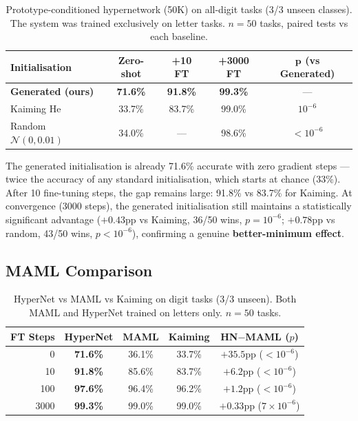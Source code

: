 \documentclass[11pt,a4paper]{article}
\begin{document}
\begin{table}[H]
\centering
\caption{Prototype-conditioned hypernetwork (50K) on all-digit tasks (3/3 unseen classes). The system was trained exclusively on letter tasks. $n = 50$ tasks, paired tests vs each baseline.}
\label{tab:core}
\begin{tabular}{lcccc}
\toprule
\textbf{Initialisation} & \textbf{Zero-shot} & \textbf{+10 FT} & \textbf{+3000 FT} & $\boldsymbol{p}$ \textbf{(vs Generated)} \\
\midrule
\textbf{Generated (ours)} & \textbf{71.6\%} & \textbf{91.8\%} & \textbf{99.3\%} & --- \\
Kaiming He & 33.7\% & 83.7\% & 99.0\% & $10^{-6}$ \\
Random $\mathcal{N}(0, 0.01)$ & 34.0\% & --- & 98.6\% & $< 10^{-6}$ \\
\bottomrule
\end{tabular}
\end{table}

The generated initialisation is already 71.6\% accurate with zero gradient steps --- twice the accuracy of any standard initialisation, which starts at chance (33\%). After 10 fine-tuning steps, the gap remains large: 91.8\% vs 83.7\% for Kaiming. At convergence (3000 steps), the generated initialisation still maintains a statistically significant advantage ($+0.43$pp vs Kaiming, 36/50 wins, $p = 10^{-6}$; $+0.78$pp vs random, 43/50 wins, $p < 10^{-6}$), confirming a genuine \textbf{better-minimum effect}.

\subsection{MAML Comparison}

\begin{table}[H]
\centering
\caption{HyperNet vs MAML vs Kaiming on digit tasks (3/3 unseen). Both MAML and HyperNet trained on letters only. $n = 50$ tasks.}
\label{tab:maml}
\begin{tabular}{rcccc}
\toprule
\textbf{FT Steps} & \textbf{HyperNet} & \textbf{MAML} & \textbf{Kaiming} & \textbf{HN$-$MAML ($p$)} \\
\midrule
0 & \textbf{71.6\%} & 36.1\% & 33.7\% & $+35.5$pp ($< 10^{-6}$) \\
10 & \textbf{91.8\%} & 85.6\% & 83.7\% & $+6.2$pp ($< 10^{-6}$) \\
100 & \textbf{97.6\%} & 96.4\% & 96.2\% & $+1.2$pp ($< 10^{-6}$) \\
3000 & \textbf{99.3\%} & 99.0\% & 99.0\% & $+0.33$pp ($7 \times 10^{-6}$) \\
\bottomrule
\end{tabular}
\end{table}
\end{document}
